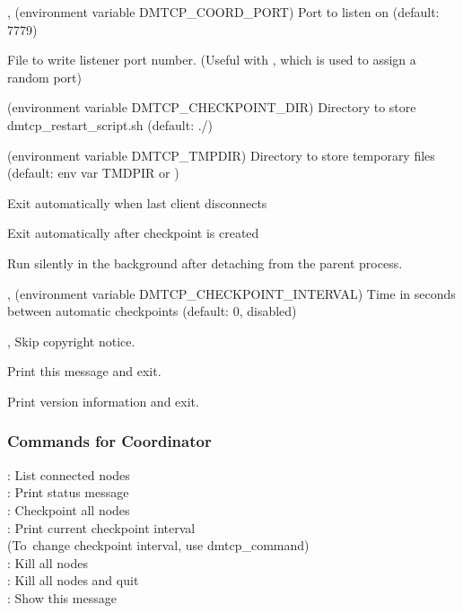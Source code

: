 \begin{Description}
  \item[\Opt{-p}, \OptSArg{--coord-port}{port} (environment variable DMTCP_COORD_PORT)]
    Port to listen on (default: 7779)

  \item[\OptSArg{--port-file}{filename}]
    File to write listener port number.
    (Useful with , which is used to assign a random port)

  \item[\OptSArg{--ckptdir}{path} (environment variable DMTCP_CHECKPOINT_DIR)]
    Directory to store dmtcp_restart_script.sh (default: ./)

  \item[\OptSArg{--tmpdir}{path} (environment variable DMTCP_TMPDIR)]
    Directory to store temporary files (default: env var TMDPIR or )

  \item[\Opt{--exit-on-last}] Exit automatically when last client disconnects

  \item[\Opt{--exit-after-ckpt}] Exit automatically after checkpoint is created

  \item[\Opt{--daemon}]
    Run silently in the background after detaching from the parent process.

  \item[\Opt{-i}, \OptSArg{--interval}{<val>} (environment variable DMTCP_CHECKPOINT_INTERVAL)]
    Time in seconds between automatic checkpoints (default: 0, disabled)

  \item[\Opt{-q}, \Opt{--quiet}] Skip copyright notice.

  \item[\Opt{--help}] Print this message and exit.

  \item[\Opt{--version}] Print version information and exit.
\end{Description}

\subsubsection{Commands for Coordinator}

: List connected nodes\\
: Print status message\\
: Checkpoint all nodes\\
: Print current checkpoint interval\\
\SP\SP\SP(To\ change checkpoint interval, use dmtcp_command)\\
: Kill all nodes\\
: Kill all nodes and quit\\
: Show this message\\
